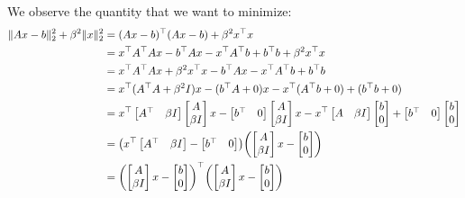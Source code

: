 \documentclass[11pt,onecolumn]{article}
\DeclarePairedDelimiter{\norm}{\lVert}{\rVert}
\DeclarePairedDelimiter{\PAREN}{(}{)}
\begin{document}
We observe the quantity that we want to minimize:
\begin{align*}
  \norm{Ax-b}_2^2+\beta^2\norm{x}_2^2 &= (Ax-b)^\top(Ax-b)+\beta^2x^\top x
  \\ &=x^\top A^\top Ax-b^\top Ax-x^\top A^\top b+b^\top b+\beta^2x^\top x
  \\ &=x^\top A^\top Ax+\beta^2 x^\top x - b^\top Ax - x^\top A^\top b+b^\top b
  \\ &= x^\top (A^\top A + \beta^2 I) x - (b^\top A + 0)x-x^\top (A^\top b + 0) + (b^\top b + 0)
  \\ &= x^\top \begin{bmatrix} A^\top & \beta I\end{bmatrix}\begin{bmatrix}A \\ \beta I\end{bmatrix} x - \begin{bmatrix}b^\top & 0\end{bmatrix}\begin{bmatrix}A \\ \beta I\end{bmatrix}x-x^\top \begin{bmatrix}A & \beta I\end{bmatrix} \begin{bmatrix}b \\ 0\end{bmatrix} + \begin{bmatrix}b^\top & 0\end{bmatrix}\begin{bmatrix}b \\ 0\end{bmatrix} 
  \\ &=\PAREN*{x^\top \begin{bmatrix} A^\top & \beta I\end{bmatrix} - \begin{bmatrix}b^\top & 0 \end{bmatrix}} \PAREN*{\begin{bmatrix} A \\ \beta I\end{bmatrix}x - \begin{bmatrix}b \\ 0 \end{bmatrix}}
  \\ &=\PAREN*{\begin{bmatrix} A \\ \beta I\end{bmatrix}x - \begin{bmatrix}b \\ 0 \end{bmatrix}}^\top \PAREN*{\begin{bmatrix} A \\ \beta I\end{bmatrix}x - \begin{bmatrix}b \\ 0 \end{bmatrix}}

\end{align*}
\end{document}
